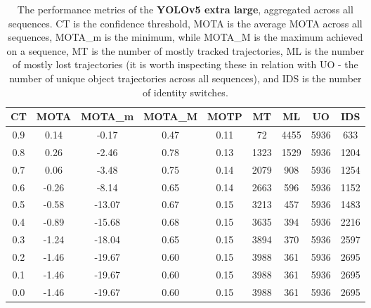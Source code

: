 \begin{table}[h]
    \centering
    \begin{tabular}{|c||c|c|c|c|c|c|c|c|}
        \hline
        CT & MOTA & MOTA\_m & MOTA\_M & MOTP & MT & ML & UO & IDS \\
        \hline
        \hline
        0.9 & 0.14 & -0.17 & 0.47 & 0.11 & 72 & 4455 & 5936 & 633 \\
        \hline
        0.8 & 0.26 & -2.46 & 0.78 & 0.13 & 1323 & 1529 & 5936 & 1204 \\
        \hline
        0.7 & 0.06 & -3.48 & 0.75 & 0.14 & 2079 & 908 & 5936 & 1254 \\
        \hline
        0.6 & -0.26 & -8.14 & 0.65 & 0.14 & 2663 & 596 & 5936 & 1152 \\
        \hline
        0.5 & -0.58 & -13.07 & 0.67 & 0.15 & 3213 & 457 & 5936 & 1483 \\
        \hline
        0.4 & -0.89 & -15.68 & 0.68 & 0.15 & 3635 & 394 & 5936 & 2216 \\
        \hline
        0.3 & -1.24 & -18.04 & 0.65 & 0.15 & 3894 & 370 & 5936 & 2597 \\
        \hline
        0.2 & -1.46 & -19.67 & 0.60 & 0.15 & 3988 & 361 & 5936 & 2695 \\
        \hline
        0.1 & -1.46 & -19.67 & 0.60 & 0.15 & 3988 & 361 & 5936 & 2695 \\
        \hline
        0.0 & -1.46 & -19.67 & 0.60 & 0.15 & 3988 & 361 & 5936 & 2695 \\
        \hline
    \end{tabular}
    \caption{The performance metrics of the \textbf{YOLOv5 extra large}, aggregated across all sequences. CT is the confidence threshold, MOTA is the average MOTA across all sequences, MOTA\_m is the minimum, while MOTA\_M is the maximum achieved on a sequence, MT is the number of mostly tracked trajectories, ML is the number of mostly lost trajectories (it is worth inspecting these in relation with UO - the number of unique object trajectories across all sequences), and IDS is the number of identity switches.}
    \label{tab:mota_yx}
\end{table}

